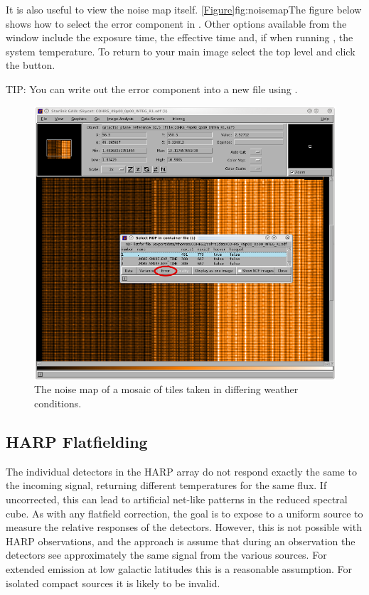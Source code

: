 \documentclass[11pt,oneside,chapters]{starlink}
\begin{document}
It is also useful to view the noise map itself.
\cref{Figure}{fig:noisemap}{The figure below} shows how to select the
error component in \gaia. Other options available from the
 window include the exposure
time, the effective time and, if  when running
\makecube, the system temperature. To return to your main image select
the top level and click the  button.

\begin{tip}
TIP: You can write out the error component into a new file using
\ndfcopy.
\begin{terminalv}
\end{terminalv}
\end{tip}


\begin{figure}[h!]
\begin{center}
\includegraphics[width=0.6\linewidth]{sc20_noimap}
\caption[The noise map of a mosaic of tiles.]{\label{fig:noisemap}
  The noise map of a mosaic of tiles taken in differing weather
  conditions.}
\end{center}
\end{figure}


\subsection{HARP Flatfielding}
\label{sec:flatfield}

The individual detectors in the HARP array do not respond exactly the
same to the incoming signal, returning different temperatures for the
same flux.  If uncorrected, this can lead to artificial net-like
patterns in the reduced spectral cube.  As with any flatfield
correction, the goal is to expose to a uniform source to measure the
relative responses of the detectors.  However, this is not possible
with HARP observations, and the approach is assume that during an
observation the detectors see approximately the same signal from the
various sources.  For extended emission at low galactic latitudes this
is a reasonable assumption.  For isolated compact sources it is likely
to be invalid.
\end{document}
